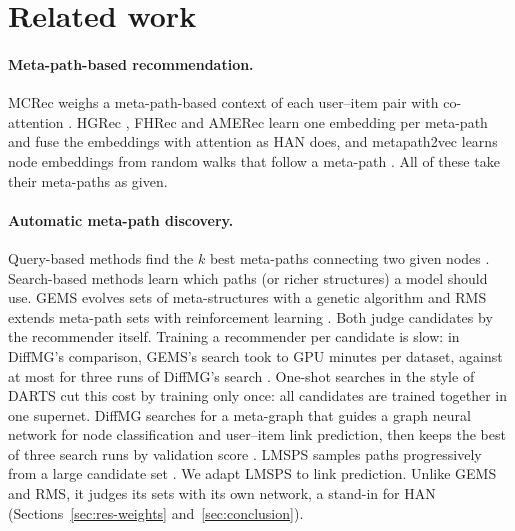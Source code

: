 \section{Related work}
\label{sec:related}

\paragraph{Meta-path-based recommendation.} MCRec weighs a meta-path-based context of each
user--item pair with co-attention \citep{hu2018leveraging}. HGRec \citep{shi2020hgrec},
FHRec \citep{mu2021fhrec} and AMERec \citep{yan2021attention} learn one embedding per meta-path and
fuse the embeddings with attention as HAN \citep{wang2019heterogeneous} does, and metapath2vec learns node
embeddings from random walks that follow a meta-path \citep{dong2017metapath2vec}. All of these
take their meta-paths as given.

\paragraph{Automatic meta-path discovery.} Query-based methods find the $k$ best meta-paths
connecting two given nodes \citep{zhu2020topk}. Search-based methods learn which paths (or richer
structures) a model should use. GEMS evolves sets of meta-structures with a genetic algorithm
\citep{han2020genetic} and RMS extends meta-path sets with reinforcement learning
\citep{ning2022automatic}. Both judge candidates by the recommender itself. Training a recommender
per candidate is slow: in DiffMG's comparison, GEMS's search took  to
 GPU minutes per dataset, against at most  for three runs of
DiffMG's search \citep[Table~5]{ding2021diffmg}. One-shot searches in the style of DARTS
\citep{liu2019darts} cut this cost by training only once: all candidates are trained together in
one supernet. DiffMG searches for a meta-graph that guides a graph neural network for node
classification and user--item link prediction, then keeps the best of three search runs by
validation score \citep{ding2021diffmg}. LMSPS samples paths progressively from a large candidate
set \citep{li2024longrange}. We adapt LMSPS to link prediction. Unlike GEMS and RMS, it judges its
sets with its own network, a stand-in for HAN (Sections~\ref{sec:res-weights}
and~\ref{sec:conclusion}).


